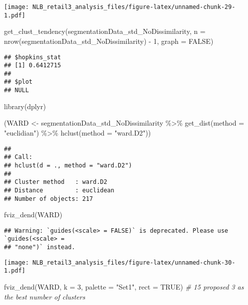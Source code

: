 \documentclass[
]{article}
\newenvironment{Shaded}{\begin{snugshade}}{\end{snugshade}}
\newcommand{\AttributeTok}[1]{\textcolor[rgb]{0.77,0.63,0.00}{#1}}
\newcommand{\CommentTok}[1]{\textcolor[rgb]{0.56,0.35,0.01}{\textit{#1}}}
\newcommand{\ConstantTok}[1]{\textcolor[rgb]{0.00,0.00,0.00}{#1}}
\newcommand{\DecValTok}[1]{\textcolor[rgb]{0.00,0.00,0.81}{#1}}
\newcommand{\FunctionTok}[1]{\textcolor[rgb]{0.00,0.00,0.00}{#1}}
\newcommand{\NormalTok}[1]{#1}
\newcommand{\OtherTok}[1]{\textcolor[rgb]{0.56,0.35,0.01}{#1}}
\newcommand{\SpecialCharTok}[1]{\textcolor[rgb]{0.00,0.00,0.00}{#1}}
\newcommand{\StringTok}[1]{\textcolor[rgb]{0.31,0.60,0.02}{#1}}
\begin{document}
\texttt{[image: NLB\_retail3\_analysis\_files/figure-latex/unnamed-chunk-29-1.pdf]}

\begin{Shaded}
\begin{Highlighting}[]
\FunctionTok{get\_clust\_tendency}\NormalTok{(segmentationData\_std\_NoDissimilarity, }\AttributeTok{n =} \FunctionTok{nrow}\NormalTok{(segmentationData\_std\_NoDissimilarity) }\SpecialCharTok{{-}} \DecValTok{1}\NormalTok{, }\AttributeTok{graph =} \ConstantTok{FALSE}\NormalTok{)}
\end{Highlighting}
\end{Shaded}

\begin{verbatim}
## $hopkins_stat
## [1] 0.6412715
## 
## $plot
## NULL
\end{verbatim}

\begin{Shaded}
\begin{Highlighting}[]
\FunctionTok{library}\NormalTok{(dplyr)}

\NormalTok{(WARD }\OtherTok{\textless{}{-}}\NormalTok{ segmentationData\_std\_NoDissimilarity }\SpecialCharTok{\%\textgreater{}\%} \FunctionTok{get\_dist}\NormalTok{(}\AttributeTok{method =} \StringTok{"euclidian"}\NormalTok{) }\SpecialCharTok{\%\textgreater{}\%} \FunctionTok{hclust}\NormalTok{(}\AttributeTok{method =} \StringTok{"ward.D2"}\NormalTok{))}
\end{Highlighting}
\end{Shaded}

\begin{verbatim}
## 
## Call:
## hclust(d = ., method = "ward.D2")
## 
## Cluster method   : ward.D2 
## Distance         : euclidean 
## Number of objects: 217
\end{verbatim}

\begin{Shaded}
\begin{Highlighting}[]
\FunctionTok{fviz\_dend}\NormalTok{(WARD)}
\end{Highlighting}
\end{Shaded}

\begin{verbatim}
## Warning: `guides(<scale> = FALSE)` is deprecated. Please use `guides(<scale> =
## "none")` instead.
\end{verbatim}

\texttt{[image: NLB\_retail3\_analysis\_files/figure-latex/unnamed-chunk-30-1.pdf]}

\begin{Shaded}
\begin{Highlighting}[]
\FunctionTok{fviz\_dend}\NormalTok{(WARD, }\AttributeTok{k =} \DecValTok{3}\NormalTok{, }\AttributeTok{palette =} \StringTok{"Set1"}\NormalTok{, }\AttributeTok{rect =} \ConstantTok{TRUE}\NormalTok{) }\CommentTok{\# 15 proposed 3 as the best number of clusters}
\end{Highlighting}
\end{Shaded}
\end{document}
